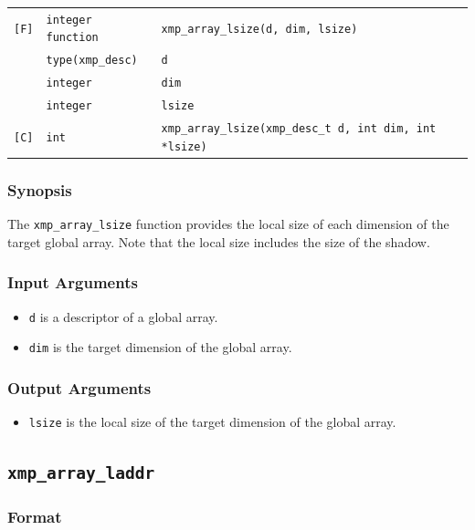 \begin{tabular}{lll}

\verb![F]!& {\tt integer function}& {\tt xmp\_array\_lsize(d, dim, lsize)}\\
          & {\tt type(xmp\_desc)} & {\tt d}\\
          & {\tt integer} & {\tt dim}\\
          & {\tt integer} & {\tt lsize}\\

\verb![C]!&  {\tt int}& {\tt xmp\_array\_lsize(xmp\_desc\_t d, int dim, int *lsize)}\\

\end{tabular}

\subsubsection*{Synopsis}

The {\tt xmp\_array\_lsize} function provides the local size of each
dimension of the target global array. Note that the local size includes
the size of the shadow.

\subsubsection*{Input Arguments}
\begin{itemize}
 \item {\tt d} is a descriptor of a global array.
 \item {\tt dim} is the target dimension of the global array.
\end{itemize}

\subsubsection*{Output Arguments}
\begin{itemize}
 \item {\tt lsize} is the local size of the target dimension of the
       global array.
\end{itemize}


\subsection{\tt xmp\_array\_laddr}

\subsubsection*{Format}

